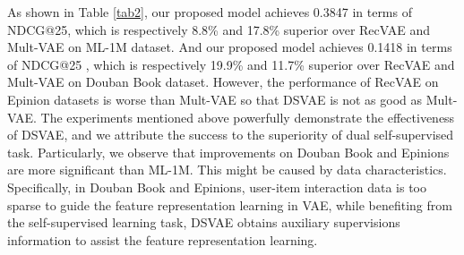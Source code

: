 As shown in Table \ref{tab2}, our proposed model achieves 0.3847 in terms of NDCG@25, which is respectively 8.8\% and 17.8\% superior over RecVAE and Mult-VAE on ML-1M dataset. And our proposed model achieves 0.1418 in terms of NDCG@25 , which is respectively 19.9\% and 11.7\% superior over RecVAE and Mult-VAE on Douban Book dataset. However, the performance of RecVAE on Epinion datasets is worse than Mult-VAE so that DSVAE is not as good as Mult-VAE. The experiments mentioned above powerfully demonstrate the effectiveness of DSVAE, and we attribute the success to the superiority of dual self-supervised task. Particularly, we observe that improvements on Douban Book and Epinions are more significant than ML-1M. This might be caused by data characteristics. Specifically, in Douban Book and Epinions, user-item interaction data is too sparse to guide the feature representation learning in VAE, while benefiting from the self-supervised learning task, DSVAE obtains auxiliary supervisions information to assist the feature representation learning.




\begin{table}
    \begin{center}
    \caption{Performance comparison with content aware VAE based CF models on dataset ML-1M.}\label{tab3}
    \end{center}
\end{table}
